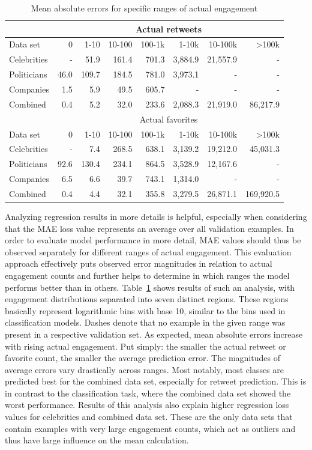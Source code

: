 \begin{table}
  \begin{tabular}{lrrrrrrr}
    \toprule
    & \multicolumn{7}{c}{Actual retweets} \\
    \midrule
    Data set & 0 & 1-10 & 10-100 & 100-1k & 1-10k & 10-100k & >100k \\
    \midrule
    Celebrities & - & 51.9 & 161.4 & 701.3 & 3,884.9 & 21,557.9 & - \\
    Politicians & 46.0 & 109.7 & 184.5 & 781.0 & 3,973.1 & - & - \\
    Companies & 1.5 & 5.9 & 49.5 & 605.7 & - & - & - \\
    Combined & 0.4 & 5.2 & 32.0 & 233.6 & 2,088.3 & 21,919.0 & 86,217.9 \\
    \bottomrule
    \toprule
    & \multicolumn{7}{c}{Actual favorites} \\
    \midrule
    Data set & 0 & 1-10 & 10-100 & 100-1k & 1-10k & 10-100k & >100k \\
    \midrule
    Celebrities & - & 7.4 & 268.5 & 638.1 & 3,139.2 & 19,212.0 & 45,031.3 \\
    Politicians & 92.6 & 130.4 & 234.1 & 864.5 & 3,528.9 & 12,167.6 & - \\
    Companies & 6.5 & 6.6 & 39.7 & 743.1 & 1,314.0 & - & - \\
    Combined & 0.4 & 4.4 & 32.1 & 355.8 & 3,279.5 & 26,871.1 & 169,920.5 \\
    \bottomrule
  \end{tabular}
  \caption{Mean absolute errors for specific ranges of actual engagement}
  \label{tab:d1_regression_eval}
\end{table}

Analyzing regression results in more details is helpful, especially when considering
that the MAE loss value represents an average over all validation examples.
In order to evaluate model performance in more detail, MAE values should thus be
observed separately for different ranges of actual engagement.
This evaluation approach effectively puts observed error magnitudes in relation
to actual engagement counts and further helps to determine in which ranges 
the model performs better than in others.
Table~\ref{tab:d1_regression_eval} shows results of such an analysis, with
engagement distributions separated into seven distinct regions.
These regions basically represent logarithmic bins with base 10, similar to
the bins used in classification models.
Dashes denote that no example in the given range was present in a respective
validation set.
As expected, mean absolute errors increase with rising actual engagement.
Put simply: the smaller the actual retweet or favorite count, the smaller the
average prediction error.
The magnitudes of average errors vary drastically across ranges.
Most notably, most classes are predicted best for the combined data set,
especially for retweet prediction.
This is in contrast to the classification task, where the combined data set
showed the worst performance.
Results of this analysis also explain higher regression loss values for
celebrities and combined data set.
These are the only data sets that contain examples with very large engagement
counts, which act as outliers and thus have large influence on the mean
calculation.

